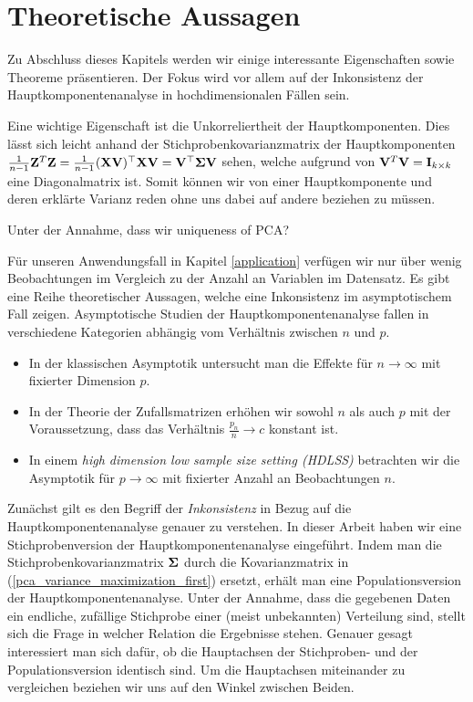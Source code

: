 

\section{Theoretische Aussagen}
\label{pca_theorems}

Zu Abschluss dieses Kapitels werden wir einige interessante Eigenschaften sowie Theoreme präsentieren. Der Fokus wird vor allem auf der Inkonsistenz der Hauptkomponentenanalyse in hochdimensionalen Fällen sein.

Eine wichtige Eigenschaft ist die Unkorreliertheit der Hauptkomponenten. Dies lässt sich leicht anhand der Stichprobenkovarianzmatrix der Hauptkomponenten $\frac{1}{n-1}\mathbf{Z}^T \mathbf{Z} = \frac{1}{n-1}(\mathbf{X} \mathbf{V})^{\top}\mathbf{X} \mathbf{V} = \mathbf{V}^{\top}\mathbf{\Sigma}\mathbf{V}$ sehen, welche aufgrund von $\mathbf{V}^T \mathbf{V} = \mathbf{I}_{k \times k}$ eine Diagonalmatrix ist. Somit können wir von einer Hauptkomponente und deren erklärte Varianz reden ohne uns dabei auf andere beziehen zu müssen.

Unter der Annahme, dass wir uniqueness of PCA?

Für unseren Anwendungsfall in Kapitel \ref{application} verfügen wir nur über wenig Beobachtungen im Vergleich zu der Anzahl an Variablen im Datensatz. Es gibt eine Reihe theoretischer Aussagen, welche eine Inkonsistenz im asymptotischem Fall zeigen. Asymptotische Studien der Hauptkomponentenanalyse fallen in verschiedene Kategorien abhängig vom Verhältnis zwischen $n$ und $p$.
\begin{itemize}
\item In der klassischen Asymptotik untersucht man die Effekte für $n \rightarrow \infty$ mit fixierter Dimension $p$.
\item In der Theorie der Zufallsmatrizen erhöhen wir sowohl $n$ als auch $p$ mit der Voraussetzung, dass das Verhältnis $\frac{p_n}{n}\rightarrow c$ konstant ist.
\item In einem \textit{high dimension low sample size setting (HDLSS)} betrachten wir die Asymptotik für $p \rightarrow \infty$ mit fixierter Anzahl an Beobachtungen $n$.
\end{itemize}
Zunächst gilt es den Begriff der \textit{Inkonsistenz} in Bezug auf die Hauptkomponentenanalyse genauer zu verstehen. In dieser Arbeit haben wir eine Stichprobenversion der Hauptkomponentenanalyse eingeführt. Indem man die Stichprobenkovarianzmatrix $\mathbf{\Sigma}$ durch die Kovarianzmatrix in (\ref{pca_variance_maximization_first}) ersetzt, erhält man eine Populationsversion der Hauptkomponentenanalyse. Unter der Annahme, dass die gegebenen Daten ein endliche, zufällige Stichprobe einer (meist unbekannten) Verteilung sind, stellt sich die Frage in welcher Relation die Ergebnisse stehen. Genauer gesagt interessiert man sich dafür, ob die Hauptachsen der Stichproben- und der Populationsversion identisch sind. Um die Hauptachsen miteinander zu vergleichen beziehen wir uns auf den Winkel zwischen Beiden.

